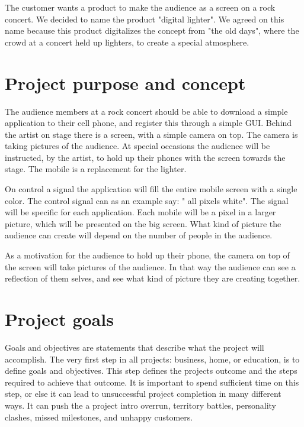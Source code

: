 The customer wants a product to make the audience as a screen on a rock concert. We decided to name the product "digital lighter". We agreed on this name because this product digitalizes the concept from "the old days", where the crowd at a concert held up lighters, to create a special atmosphere. 

\section{Project purpose and concept}

The audience members at a rock concert should be able to download a simple application to their cell phone, and register this through a simple GUI.
Behind the artist on stage there is a screen, with a simple camera on top. 
The camera is taking pictures of the audience. 
At special occasions the audience will be instructed, by the artist, to hold up their phones with the screen towards the stage. 
The mobile is a replacement for the lighter.  

On control a signal the application will fill the entire mobile screen with a single color.
The control signal can as an example say: " all pixels white". 
The signal will be specific for each application.
Each mobile will be a pixel in a larger picture, which will be presented on the big screen. 
What kind of picture the audience can create will depend on the number of people in the audience.   

As a motivation for the audience to hold up their phone, the camera on top of the screen will take pictures of the audience.
In that way the audience can see a reflection of them selves, and see what kind of picture they are creating together.

\section{Project goals}
Goals and objectives are statements that describe what the project will accomplish. The very first step in all projects: business, home, or education, is to define goals and objectives. 
This step defines the projects outcome and the steps required to achieve that outcome. 
It is important to spend sufficient time on this step, or else it can lead to unsuccessful project completion in many different ways. It can push the  a project intro overrun, territory battles, personality clashes, missed milestones, and unhappy customers. 
   
\label{sec:project-goals}

